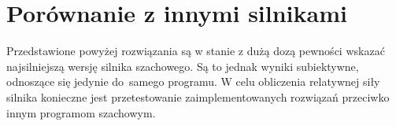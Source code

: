 \section {Porównanie z innymi silnikami}
\label {sec: porownianie-z-silnikami}

Przedstawione powyżej rozwiązania są w stanie z dużą dozą pewności wskazać najsilniejszą wersję silnika szachowego.
Są to jednak wyniki subiektywne, odnoszące się jedynie do~samego programu.
W celu obliczenia relatywnej siły silnika konieczne jest przetestowanie zaimplementowanych rozwiązań przeciwko innym programom szachowym.


